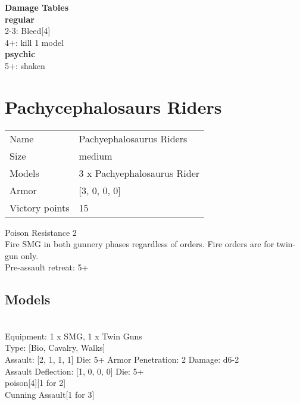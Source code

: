  





{\bf Damage Tables} \\
 {\bf regular } \\
2-3: Bleed[4] \\
4+: kill 1 model \\
 {\bf psychic } \\
5+: shaken \\










\pagebreak\pagebreak

\section{ Pachycephalosaurs Riders }

\begin{tabular}{ll}
  Name & Pachyephalosaurus Riders \\
  Size & medium\\
  Models & 3 x Pachyephalosaurus Rider\\
  Armor & [3, 0, 0, 0]\\
  Victory points & 15\\
\end{tabular}

Poison Resistance 2\\ 
Fire SMG in both gunnery phases regardless of orders. Fire orders are for twin-gun only.\\ 
Pre-assault retreat: 5+\\ 


\subsection{ Models }

 \\
Equipment: 1 x SMG, 1 x Twin Guns \\
Type: [Bio, Cavalry, Walks] \\

Assault: [2, 1, 1, 1] Die: 5+ Armor Penetration: 2 Damage: d6-2 \\
Assault Deflection: [1, 0, 0, 0] Die: 5+\\
\indent poison[4][1 for 2]\\ 
Cunning Assault[1 for 3]\\ 
 



